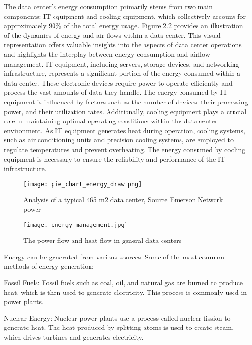 \documentclass[
  a4paper,  %
  twoside,  %
  bibliography=totoc,
  headsepline,
  cleardoublepage=empty,
  parskip=half,
  draft=false
]{scrbook}
\begin{document}
The data center's energy consumption primarily stems from two main components: IT equipment and cooling equipment, which collectively account for approximately 90\% of the total energy usage\cite{JIN2020114806}. Figure 2.2 provides an illustration of the dynamics of energy and air flows within a data center. This visual representation offers valuable insights into the aspects of data center operations and highlights the interplay between energy consumption and airflow management. IT equipment, including servers, storage devices, and networking infrastructure, represents a significant portion of the energy consumed within a data center. These electronic devices require power to operate efficiently and process the vast amounts of data they handle. The energy consumed by IT equipment is influenced by factors such as the number of devices, their processing power, and their utilization rates\cite{von2016variations}. Additionally, cooling equipment plays a crucial role in maintaining optimal operating conditions within the data center environment. As IT equipment generates heat during operation, cooling systems, such as air conditioning units and precision cooling systems, are employed to regulate temperatures and prevent overheating. The energy consumed by cooling equipment is necessary to ensure the reliability and performance of the IT infrastructure\cite{rong2016optimizing}.

\begin{figure}
	\centering
	\texttt{[image: pie\_chart\_energy\_draw.png]}
	\caption{Analysis of a typical 465 m2 data center, Source Emerson Network power\cite{emerson2015}}
\end{figure}



\begin{figure}
	\centering
	\texttt{[image: energy\_management.jpg]}
	\caption{The power flow and heat flow in general data centers \cite{JIN2020114806}}
\end{figure}

Energy can be generated from various sources. Some of the most common methods of energy generation:

Fossil Fuels: Fossil fuels such as coal, oil, and natural gas are burned to produce heat, which is then used to generate electricity. This process is commonly used in power plants\cite{owid-fossil-fuels}.

Nuclear Energy: Nuclear power plants use a process called nuclear fission to generate heat. The heat produced by splitting atoms is used to create steam, which drives turbines and generates electricity\cite{ritchie2023nuclear}.
\end{document}
